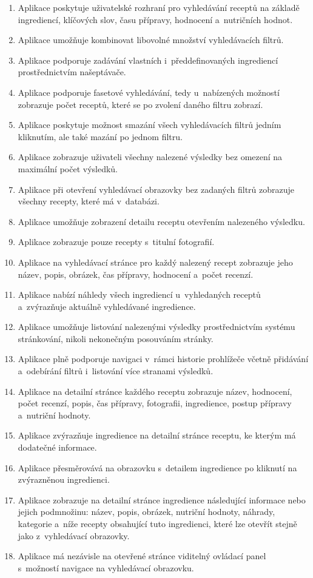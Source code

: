 \begin{enumerate}
    \item Aplikace poskytuje uživatelské rozhraní pro vyhledávání receptů na základě ingrediencí, klíčových slov, času přípravy, hodnocení a~nutričních hodnot.
    \item Aplikace umožňuje kombinovat libovolné množství vyhledávacích filtrů.
    \item Aplikace podporuje zadávání vlastních i~předdefinovaných ingrediencí prostřednictvím našeptávače.
    \item Aplikace podporuje fasetové vyhledávání, tedy u~nabízených možností zobrazuje počet receptů, které se po zvolení daného filtru zobrazí.
    \item Aplikace poskytuje možnost smazání všech vyhledávacích filtrů jedním kliknutím, ale také mazání po jednom filtru.
    \item Aplikace zobrazuje uživateli všechny nalezené výsledky bez omezení na maximální počet výsledků.
    \item Aplikace při otevření vyhledávací obrazovky bez zadaných filtrů zobrazuje všechny recepty, které má v~databázi.
    \item Aplikace umožňuje zobrazení detailu receptu otevřením nalezeného výsledku.
    \item Aplikace zobrazuje pouze recepty s~titulní fotografií.
    \item Aplikace na vyhledávací stránce pro každý nalezený recept zobrazuje jeho název, popis, obrázek, čas přípravy, hodnocení a~počet recenzí.
    \item Aplikace nabízí náhledy všech ingrediencí u~vyhledaných receptů a~zvýrazňuje aktuálně vyhledávané ingredience.
    \item Aplikace umožňuje listování nalezenými výsledky prostřednictvím systému stránkování, nikoli nekonečným posouváním stránky.
    \item Aplikace plně podporuje navigaci v~rámci historie prohlížeče včetně přidávání a~odebírání filtrů i~listování více stranami výsledků.
    \item Aplikace na detailní stránce každého receptu zobrazuje název, hodnocení, počet recenzí, popis, čas přípravy, fotografii, ingredience, postup přípravy a~nutriční hodnoty.
    \item Aplikace zvýrazňuje ingredience na detailní stránce receptu, ke kterým má dodatečné informace.
    \item Aplikace přesměrovává na obrazovku s~detailem ingredience po kliknutí na zvýrazněnou ingredienci.
    \item Aplikace zobrazuje na detailní stránce ingredience následující informace nebo jejich podmnožinu: název, popis, obrázek, nutriční hodnoty, náhrady, kategorie a~níže recepty obsahující tuto ingredienci, které lze otevřít stejně jako z~vyhledávací obrazovky.
    \item Aplikace má nezávisle na otevřené stránce viditelný ovládací panel s~možností navigace na vyhledávací obrazovku.
\end{enumerate}

